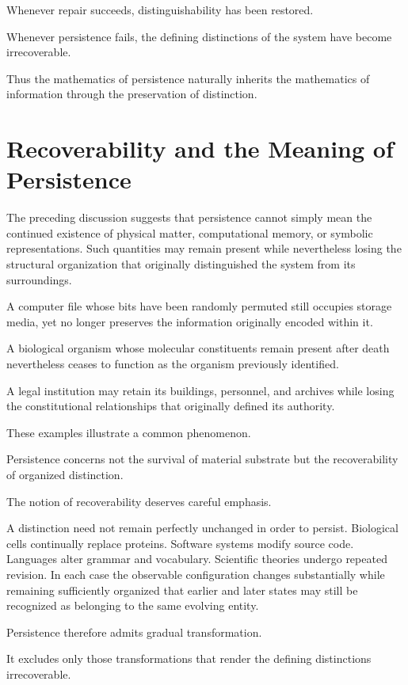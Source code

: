 \documentclass[11pt]{book}
\numberwithin{equation}{chapter}
\theoremstyle{definition}
\theoremstyle{plain}
\begin{document}
Whenever repair succeeds, distinguishability has been restored.

Whenever persistence fails, the defining distinctions of the system have become irrecoverable.

Thus the mathematics of persistence naturally inherits the mathematics of information through the preservation of distinction.

\section{Recoverability and the Meaning of Persistence}

The preceding discussion suggests that persistence cannot simply mean the continued existence of physical matter, computational memory, or symbolic representations. Such quantities may remain present while nevertheless losing the structural organization that originally distinguished the system from its surroundings.

A computer file whose bits have been randomly permuted still occupies storage media, yet no longer preserves the information originally encoded within it.

A biological organism whose molecular constituents remain present after death nevertheless ceases to function as the organism previously identified.

A legal institution may retain its buildings, personnel, and archives while losing the constitutional relationships that originally defined its authority.

These examples illustrate a common phenomenon.

Persistence concerns not the survival of material substrate but the recoverability of organized distinction.

The notion of recoverability deserves careful emphasis.

A distinction need not remain perfectly unchanged in order to persist. Biological cells continually replace proteins. Software systems modify source code. Languages alter grammar and vocabulary. Scientific theories undergo repeated revision. In each case the observable configuration changes substantially while remaining sufficiently organized that earlier and later states may still be recognized as belonging to the same evolving entity.

Persistence therefore admits gradual transformation.

It excludes only those transformations that render the defining distinctions irrecoverable.
\end{document}

